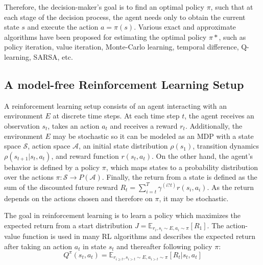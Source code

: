 Therefore, the decision-maker's goal is to find an optimal policy $\pi$, such that at each stage of the decision process, the agent needs only to obtain the current state $s$ and execute the action $a=\pi(s)$. Various exact and approximate algorithms have been proposed for estimating the optimal policy $\pi*$, such as policy iteration, value iteration, Monte-Carlo learning, temporal difference, Q-learning, SARSA, etc\cite{kaelbling1996reinforcement}\cite{sutton1998reinforcement}.

\subsection{A model-free Reinforcement Learning Setup}
\label{sec:model-free}

A reinforcement learning setup consists of an agent interacting with an environment $E$ at discrete time steps. At each time step $t$, the agent receives an observation $s_t$, takes an action $a_t$ and receives a reward $r_t$. Additionally, the environment $E$ may be stochastic so it can be modeled as an MDP with a state space $\mathcal{S}$, action space $\mathcal{A}$, an initial state distribution $\rho(s_1)$, transition dynamics $\rho(s_{t+1}|s_t, a_t)$, and reward function $r(s_t, a_t)$. On the other hand, the agent's behavior is defined by a policy $\pi$, which maps states to a probability distribution over the actions $\pi : \mathcal{S} \rightarrow P(\mathcal{A})$. Finally, the return from a state is defined as the sum of the discounted future reward $R_t = \sum^T_{i=t} \gamma^{(i?t)}r(s_i, a_i)$. As the return depends on the actions chosen and therefore on $\pi$, it may be stochastic. 

The goal in reinforcement learning is to learn a policy which maximizes the expected return from a start distribution $J = \mathbb{E}_{r_i,s_i \sim E,a_i \sim \pi}[R_1]$. The action-value function is used in many RL algorithms and describes the expected return after taking an action $a_t$ in state $s_t$ and thereafter following policy $\pi$:
\begin{equation}
\label{eq:action-valueFcn}
Q^{\pi}(s_t, a_t) = \mathbb{E}_{r_{i \geq t}, s_{i > t} \sim E, a_{i > t} \sim \pi} [R_t| s_t, a_t]
\end{equation}

